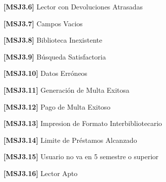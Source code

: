 	\begin{Citemize}
	\item {\bf [MSJ3.6]} Lector con Devoluciones Atrasadas
	\end{Citemize}
	
	\begin{Citemize}
	\item {\bf [MSJ3.7]} Campos Vacios
	\end{Citemize}
	
	\begin{Citemize}
	\item {\bf [MSJ3.8]} Biblioteca Inexistente
	\end{Citemize}
	
	\begin{Citemize}
	\item {\bf [MSJ3.9]} Búsqueda Satisfactoria
	\end{Citemize}
	
	\begin{Citemize}
	\item {\bf [MSJ3.10]} Datos Erróneos
	\end{Citemize}
	
	\begin{Citemize}
	\item {\bf [MSJ3.11]} Generación de Multa Exitosa
	\end{Citemize}
	
	\begin{Citemize}
	\item {\bf [MSJ3.12]} Pago de Multa Exitoso
	\end{Citemize}
	
	\begin{Citemize}
	\item {\bf [MSJ3.13]} Impresion de Formato Interbibliotecario
	\end{Citemize}
	
	\begin{Citemize}
	\item {\bf [MSJ3.14]} Limite de Préstamos Alcanzado
	\end{Citemize}
	
	\begin{Citemize}
	\item {\bf [MSJ3.15]} Usuario no va en 5 semestre o superior
	\end{Citemize}
	
	\begin{Citemize}
	\item {\bf [MSJ3.16]} Lector Apto
	\end{Citemize}
	
